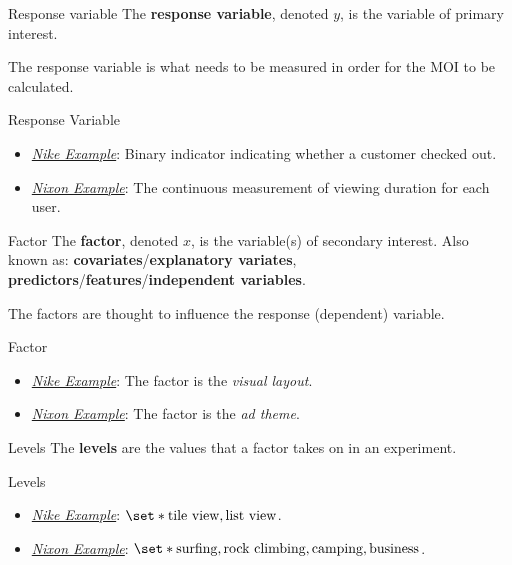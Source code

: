 \begin{Definition}{Response variable}{}
    The \textbf{response variable}, denoted $ y $, is the variable of primary interest.
\end{Definition}
\begin{Remark}{}{}
    The response variable is what needs to be measured in order for the MOI to be calculated.
\end{Remark}
\begin{Example}{Response Variable}{}
    \begin{itemize}
        \item \emph{\hyperref[ex:nike_ex]{Nike Example}}: Binary indicator indicating
              whether a customer checked out.
        \item \emph{\hyperref[ex:nixon_ex]{Nixon Example}}: The continuous measurement
              of viewing duration for each user.
    \end{itemize}
\end{Example}
\begin{Definition}{Factor}{}
    The \textbf{factor}, denoted $ x $, is the variable(s) of secondary interest.
    Also known as: \textbf{covariates}/\textbf{explanatory variates},
    \textbf{predictors}/\textbf{features}/\textbf{independent variables}.
\end{Definition}
\begin{Remark}{}{}
    The factors are thought to influence the response (dependent) variable.
\end{Remark}
\begin{Example}{Factor}{}
    \begin{itemize}
        \item \emph{\hyperref[ex:nike_ex]{Nike Example}}: The factor is the \emph{visual layout}.
        \item \emph{\hyperref[ex:nixon_ex]{Nixon Example}}: The factor is the \emph{ad theme}.
    \end{itemize}
\end{Example}
\begin{Definition}{Levels}{}
    The \textbf{levels} are the values that a factor takes on in an experiment.
\end{Definition}
\begin{Example}{Levels}{}
    \begin{itemize}
        \item \emph{\hyperref[ex:nike_ex]{Nike Example}}: $ \set*{\text{tile view}, \text{list view}} $.
        \item \emph{\hyperref[ex:nixon_ex]{Nixon Example}}: $ \set*{\text{surfing}, \text{rock climbing}, \text{camping}, \text{business}} $.
    \end{itemize}
\end{Example}
